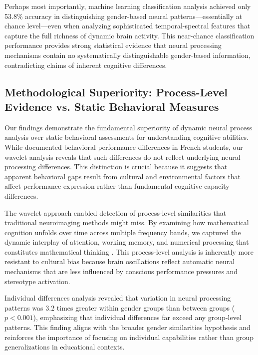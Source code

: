 \documentclass[pdflatex,sn-nature]{sn-jnl}%
\theoremstyle{thmstyleone}%
\theoremstyle{thmstyletwo}%
\theoremstyle{thmstylethree}%
\begin{document}
Perhaps most importantly, machine learning classification analysis achieved only 53.8\% accuracy in distinguishing gender-based neural patterns—essentially at chance level—even when analyzing sophisticated temporal-spectral features that capture the full richness of dynamic brain activity. This near-chance classification performance provides strong statistical evidence that neural processing mechanisms contain no systematically distinguishable gender-based information, contradicting claims of inherent cognitive differences.


\subsection{Methodological Superiority: Process-Level Evidence vs. Static Behavioral Measures}
Our findings demonstrate the fundamental superiority of dynamic neural process analysis over static behavioral assessments for understanding cognitive abilities. While \cite{martinot2025mathematical} documented behavioral performance differences in French students, our wavelet analysis reveals that such differences do not reflect underlying neural processing differences. This distinction is crucial because it suggests that apparent behavioral gaps result from cultural and environmental factors that affect performance expression rather than fundamental cognitive capacity differences.

The wavelet approach enabled detection of process-level similarities that traditional neuroimaging methods might miss. By examining how mathematical cognition unfolds over time across multiple frequency bands, we captured the dynamic interplay of attention, working memory, and numerical processing that constitutes mathematical thinking \cite{arsalidou2011brain,nieder2016neural}. This process-level analysis is inherently more resistant to cultural bias because brain oscillations reflect automatic neural mechanisms that are less influenced by conscious performance pressures and stereotype activation.

Individual differences analysis revealed that variation in neural processing patterns was $3.2$ times greater within gender groups than between groups ($p < 0.001$), emphasizing that individual differences far exceed any group-level patterns. This finding aligns with the broader gender similarities hypothesis \cite{hyde2005gender} and reinforces the importance of focusing on individual capabilities rather than group generalizations in educational contexts.
\end{document}
